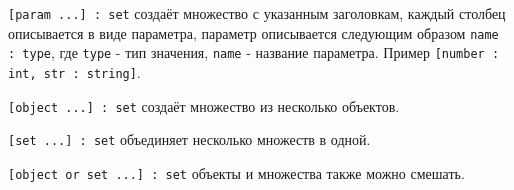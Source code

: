 \texttt{[param ...] : set} создаёт множество с указанным заголовкам, каждый столбец описывается в виде параметра, параметр описывается следующим образом \texttt{name : type}, где \texttt{type} - тип значения, \texttt{name} - название параметра. Пример \texttt{[number : int, str : string]}.

\texttt{[object ...] : set} создаёт множество из несколько объектов.

\texttt{[set ...] : set} объединяет несколько множеств в одной.

\texttt{[object or set ...] : set} объекты и множества также можно смешать.

